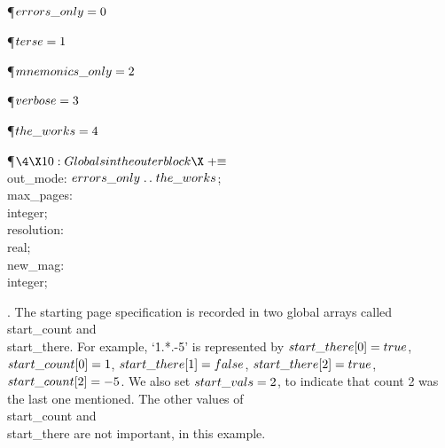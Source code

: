 \Y\P\D {}$\\{errors\_only}=0$\par
\P\D {}$\\{terse}=1$\par
\P\D {}$\\{mnemonics\_only}=2$\par
\P\D {}$\\{verbose}=3$\par
\P\D {}$\\{the\_works}=4$\par
\Y\P$\4\X10:Globals in the outer block\X\mathrel{+}\S$\6
\4\\{out\_mode}: $\\{errors\_only}\to\\{the\_works}$;\6
\4\\{max\_pages}: \\{integer};\6
\4\\{resolution}: \\{real};\6
\4\\{new\_mag}: \\{integer};\par
\fi

. The starting page specification is recorded in two global arrays called
\\{start\_count} and \\{start\_there}. For example, `\.{1.*.-5}' is represented
by $\\{start\_there}[0]=\\{true}$, $\\{start\_count}[0]=1$, $\\{start%
\_there}[1]=\\{false}$,
$\\{start\_there}[2]=\\{true}$, $\\{start\_count}[2]=-5$.
We also set $\\{start\_vals}=2$, to indicate that count 2 was the last one
mentioned. The other values of \\{start\_count} and \\{start\_there} are not
important, in this example.

